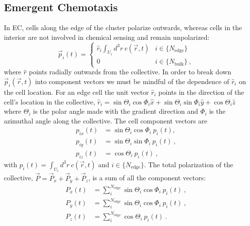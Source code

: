 \subsection{Emergent Chemotaxis}

In EC, cells along the edge of the cluster polarize outwards, whereas cells in the interior are not involved in chemical sensing and remain unpolarized:
\begin{equation}
    \vec{p}_i(t) =
    \begin{cases}
         \hat{r}_i \int_{U_i} d^3r \ c(\vec{r},t) &i \in \{ N_\text{edge} \} \\
        0 &i \in \{ N_\text{bulk} \} \ ,
    \end{cases}
\end{equation}
where $\hat{r}$ points radially outwards from the collective. In order to break down $\vec{p}_i(\vec{r},t)$ into component vectors we must be mindful of the dependence of $\hat{r}_i$ on the cell location. For an edge cell the unit vector $\hat{r}_i$ points in the direction of the cell's location in the collective,
$\hat{r}_i = \sin\Theta_i\cos\Phi_i \hat{x} + \sin\Theta_i\sin\Phi_i \hat{y} + \cos\Theta_i \hat{z}$
where $\Theta_i$ is the polar angle made with the gradient direction and $\Phi_i$ is the azimuthal angle along the collective. The cell component vectors are
\begin{align}
    p_{ix}(t) &= \sin\Theta_i\cos\Phi_i \ p_i(t) , \\
    p_{iy}(t) &= \sin\Theta_i\sin\Phi_i \ p_i(t) \ , \\
    p_{iz}(t) &= \cos\Theta_i \ p_i(t) \ ,
\end{align}
with $p_i(t) = \int_{U_i} d^3r \ c(\vec{r},t)$ and $i \in \{ N_\text{edge}\}$. The total polarization of the collective,
$\vec{P} = \vec{P}_x + \vec{P}_y + \vec{P}_z$,
is a sum of all the component vectors:
\begin{align}
    P_x(t) &= \sum_i^{N_\text{edge}} \sin\Theta_i\cos\Phi_i \ p_i(t) \ , \label{eq:PECx} \\
    P_y(t) &= \sum_i^{N_\text{edge}} \sin\Theta_i\cos\Phi_i \ p_i(t) \ , \label{eq:PECy} \\
    P_z(t) &= \sum_i^{N_\text{edge}} \cos\Theta_i \ p_i(t) \ . \label{eq:PECz}
\end{align}

